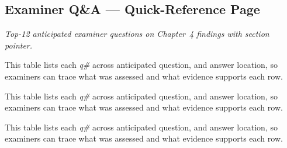 \subsection{Examiner Q\&A --- Quick-Reference Page}
\label{sec:ch4_examiner_qa_snapshot}
\noindent\emph{Top-12 anticipated examiner questions on Chapter~4 findings with section pointer.}


\noindent This table lists each \textit{q\#} across anticipated question, and answer location, so examiners can trace what was assessed and what evidence supports each row.



\noindent This table lists each \textit{q\#} across anticipated question, and answer location, so examiners can trace what was assessed and what evidence supports each row.


\noindent This table lists each \textit{q\#} across anticipated question, and answer location, so examiners can trace what was assessed and what evidence supports each row.



